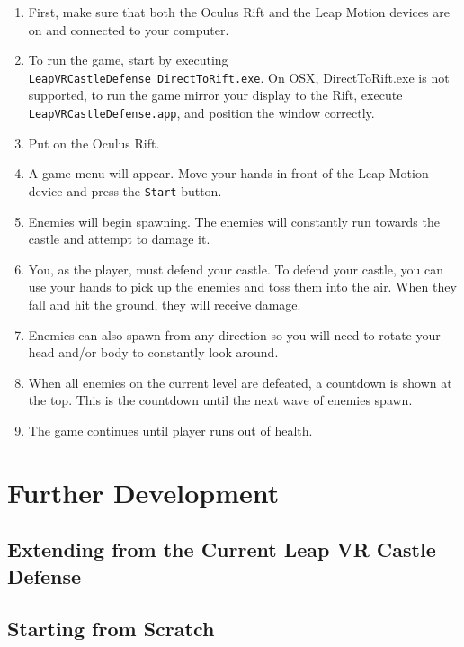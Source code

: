 \documentclass[a4paper]{refart}
\begin{document}
\begin{enumerate}
	\item First, make sure that both the Oculus Rift and the Leap Motion devices are on and connected to your computer.
	\item To run the game, start by executing \texttt{LeapVRCastleDefense\_DirectToRift.exe}. On OSX, DirectToRift.exe is not supported, to run the game mirror your display to the Rift, execute \texttt{LeapVRCastleDefense.app}, and position the window correctly.
	\item Put on the Oculus Rift.
	\item A game menu will appear. Move your hands in front of the Leap Motion device and press the \texttt{Start} button.
	\item Enemies will begin spawning. The enemies will constantly run towards the castle and attempt to damage it. 
	\item You, as the player, must defend your castle. To defend your castle, you can use your hands to pick up the enemies and toss them into the air. When they fall and hit the ground, they will receive damage. 
	\item Enemies can also spawn from any direction so you will need to rotate your head and/or body to constantly look around.
	\item When all enemies on the current level are defeated, a countdown is shown at the top. This is the countdown until the next wave of enemies spawn. 
	\item The game continues until player runs out of health.
\end{enumerate}

\section{Further Development}

\subsection{Extending from the Current Leap VR Castle Defense}

\subsection{Starting from Scratch}
\end{document}
